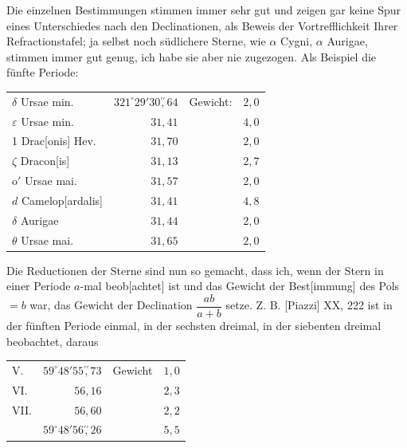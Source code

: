 \noindent\hspace*{\parindent}Die einzelnen Bestimmungen stimmen immer sehr gut und zeigen gar keine Spur eines Unterschiedes nach den Declinationen, als Beweis der Vortrefflichkeit Ihrer Refractionstafel; ja selbst noch südlichere Sterne, wie \(\alpha\) Cygni, \(\alpha\) Aurigae, stimmen immer gut genug, ich habe sie aber nie zugezogen. Als Beispiel die fünfte Periode:
\begin{center}\begingroup\setlength{\tabcolsep}{5pt}
\begin{tabular}{@{}lrlr@{}}
\(\delta\) Ursae min.&\(321^\circ29'30\overset{\prime\prime}{,}64\)&Gewicht:&\(2{,}0\)\\
\(\varepsilon\) Ursae min.&\(31{,}41\)&&\(4{,}0\)\\
1 Drac[onis] Hev.&\(31{,}70\)&&\(2{,}0\)\\
\(\zeta\) Dracon[is]&\(31{,}13\)&&\(2{,}7\)\\
\(\mathrm{o}'\) Ursae mai.&\(31{,}57\)&&\(2{,}0\)\\
\(d\) Camelop[ardalis]&\(31{,}41\)&&\(4{,}8\)\\
\(\delta\) Aurigae&\(31{,}44\)&&\(2{,}0\)\\
\(\theta\) Ursae mai.&\(31{,}65\)&&\(2{,}0\)
\end{tabular}\par\endgroup\end{center}

\noindent\hspace*{\parindent}Die Reductionen der Sterne sind nun so gemacht, dass ich, wenn der
\clearpage{}
\noindent Stern in einer Periode \(a\)-mal beob[achtet] ist und das Gewicht der Best[immung] des Pols \(=b\) war, das Gewicht der Declination \(\dfrac{ab}{a+b}\) setze. Z. B. [Piazzi] XX, 222 ist in der fünften Periode einmal, in der sechsten dreimal, in der siebenten dreimal beobachtet, daraus
\begin{center}\begin{tabular}{@{}lrlr@{}}
V.&\(59^\circ48'55\overset{\prime\prime}{,}73\)&Gewicht&\(1{,}0\)\\
VI.&\(56{,}16\)&&\(2{,}3\)\\
VII.&\(56{,}60\)&&\(2{,}2\)\\\hline
&\(59^\circ48'56\overset{\prime\prime}{,}26\)&&\(5{,}5\)
\end{tabular}\end{center}

